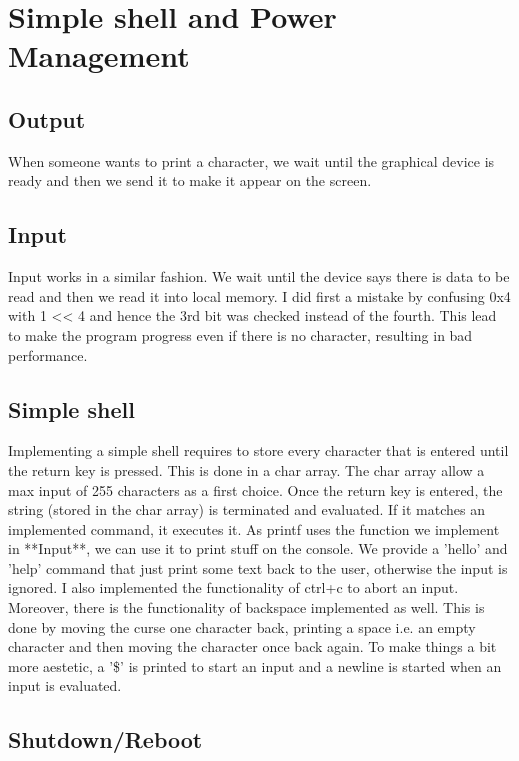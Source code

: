 \chapter{Simple shell and Power Management}

\section{Output}

When someone wants to print a character, we wait until the graphical device is
ready and then we send it to make it appear on the screen.

\section{Input}

Input works in a similar fashion. We wait until the device says there is data to
be read and then we read it into local memory.  I did first a mistake by
confusing 0x4 with 1 << 4 and hence the 3rd bit was checked instead of the
fourth. This lead to make the program progress even if there is no character,
resulting in bad performance.

\section{Simple shell}

Implementing a simple shell requires to store every character that is entered
until the return key is pressed. This is done in a char array. The char array
allow a max input of 255 characters as a first choice.  Once the return key is
entered, the string (stored in the char array) is terminated and evaluated. If
it matches an implemented command, it executes it.  As printf uses the function
we implement in **Input**, we can use it to print stuff on the console. We
provide a 'hello' and 'help' command that just print some text back to the user,
otherwise the input is ignored.  I also implemented the functionality of ctrl+c
to abort an input. Moreover, there is the functionality of backspace implemented
as well. This is done by moving the curse one character back, printing a space
i.e. an empty character and then moving the character once back again.  To make
things a bit more aestetic, a '\$' is printed to start an input and a newline is
started when an input is evaluated.

\section{Shutdown/Reboot}

